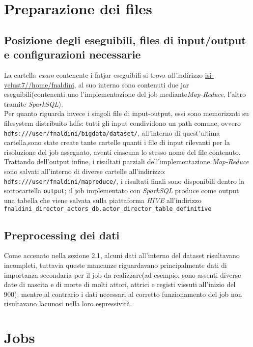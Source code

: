 \documentclass[hidelinks]{article}
\begin{document}
\section{Preparazione dei files}

\subsection{Posizione degli eseguibili, files di input/output e configurazioni necessarie}
La cartella \textit{exam} contenente i fatjar eseguibili si trova all'indirizzo \url{isi-vclust7//home/fnaldini}, al suo interno sono contenuti due jar eseguibili(contenenti uno l'implementazione del job mediante\textit{Map-Reduce}, l'altro tramite \textit{SparkSQL}).\\
Per quanto riguarda invece i singoli file di input-output, essi sono memorizzati su filesystem distribuito hdfs: tutti gli input condividono un path comune, ovvero \texttt{hdfs:///user/fnaldini/bigdata/dataset/}, all'interno di quest'ultima cartella,sono state create tante cartelle quanti i file di input rilevanti per la risoluzione del job assegnato, aventi ciascuna lo stesso nome del file contenuto.\\
Trattando dell'output infine, i risultati parziali dell'implementazione \textit{Map-Reduce}  sono salvati all'interno di diverse cartelle all'indirizzo: \texttt{hdfs:///user/fnaldini/mapreduce/}, i risultati finali sono disponibili dentro la sottocartella \texttt{output}; il job implementato con \textit{SparkSQL} produce come output una tabella che viene salvata sulla piattaforma \textit{HIVE} all'indirizzo\\ \texttt{fnaldini\_director\_actors\_db.actor\_director\_table\_definitive}

\subsection{Preprocessing dei dati}
Come accenato nella sezione 2.1, alcuni dati all'interno del dataset risultavano incompleti, tuttavia queste mancanze riguardavano principalmente dati di importanza secondaria per il job da realizzare(ad esempio, sono assenti diverse date di nascita e di morte di molti attori, attrici e registi vissuti all'inizio del 900), mentre al contrario i dati necessari al corretto funzionamento del job non risultavano lacunosi nella loro espressività.



\section{Jobs}
\end{document}
